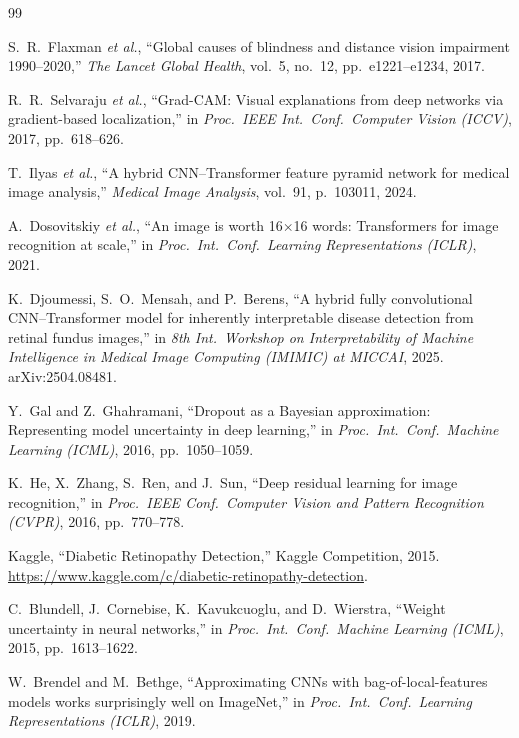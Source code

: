 \documentclass[conference]{IEEEtran}
\begin{document}
\begin{thebibliography}{99}

S.\ R.\ Flaxman \emph{et al.}, ``Global causes of blindness and distance vision impairment 1990--2020,'' \emph{The Lancet Global Health}, vol.\ 5, no.\ 12, pp.\ e1221--e1234, 2017.

R.\ R.\ Selvaraju \emph{et al.}, ``Grad-CAM: Visual explanations from deep networks via gradient-based localization,'' in \emph{Proc.\ IEEE Int.\ Conf.\ Computer Vision (ICCV)}, 2017, pp.\ 618--626.

T.\ Ilyas \emph{et al.}, ``A hybrid CNN--Transformer feature pyramid network for medical image analysis,'' \emph{Medical Image Analysis}, vol.\ 91, p.\ 103011, 2024.

A.\ Dosovitskiy \emph{et al.}, ``An image is worth 16$\times$16 words: Transformers for image recognition at scale,'' in \emph{Proc.\ Int.\ Conf.\ Learning Representations (ICLR)}, 2021.

K.\ Djoumessi, S.\ O.\ Mensah, and P.\ Berens, ``A hybrid fully convolutional CNN--Transformer model for inherently interpretable disease detection from retinal fundus images,'' in \emph{8th Int.\ Workshop on Interpretability of Machine Intelligence in Medical Image Computing (IMIMIC) at MICCAI}, 2025. arXiv:2504.08481.

Y.\ Gal and Z.\ Ghahramani, ``Dropout as a Bayesian approximation: Representing model uncertainty in deep learning,'' in \emph{Proc.\ Int.\ Conf.\ Machine Learning (ICML)}, 2016, pp.\ 1050--1059.

K.\ He, X.\ Zhang, S.\ Ren, and J.\ Sun, ``Deep residual learning for image recognition,'' in \emph{Proc.\ IEEE Conf.\ Computer Vision and Pattern Recognition (CVPR)}, 2016, pp.\ 770--778.

Kaggle, ``Diabetic Retinopathy Detection,'' Kaggle Competition, 2015. \url{https://www.kaggle.com/c/diabetic-retinopathy-detection}.

C.\ Blundell, J.\ Cornebise, K.\ Kavukcuoglu, and D.\ Wierstra, ``Weight uncertainty in neural networks,'' in \emph{Proc.\ Int.\ Conf.\ Machine Learning (ICML)}, 2015, pp.\ 1613--1622.

W.\ Brendel and M.\ Bethge, ``Approximating CNNs with bag-of-local-features models works surprisingly well on ImageNet,'' in \emph{Proc.\ Int.\ Conf.\ Learning Representations (ICLR)}, 2019.

\end{thebibliography}
\end{document}
